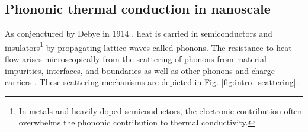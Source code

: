 



\subsection{Phononic thermal conduction in nanoscale}
\label{sec:intro_vib}



As conjenctured by Debye in 1914 \cite{}, heat is carried in semiconductors and insulators\footnote{In metals and heavily doped semiconductors, the electronic contribution often overwhelms the phononic contribution to thermal conductivity.} by propagating lattice waves called phonons. The resistance to heat flow arises microscopically from the scattering of phonons from material impurities, interfaces, and boundaries as well as other phonons and charge carriers \cite{peierls29,ziman}. These scattering mechanisms are depicted in Fig. \ref{fig:intro_scattering}. 


